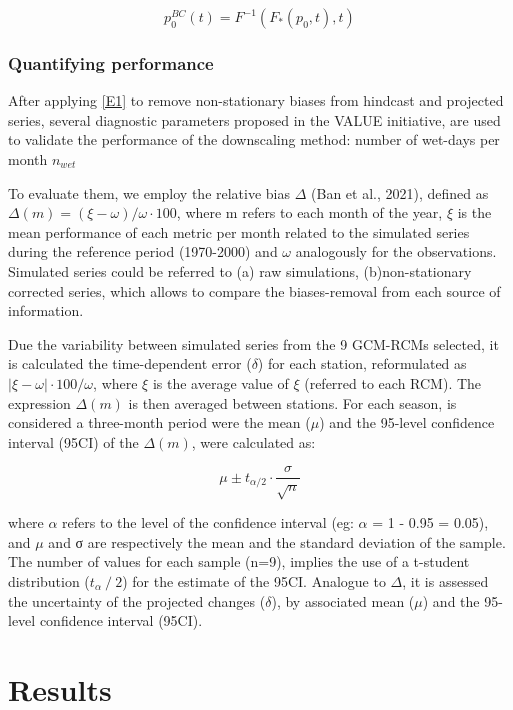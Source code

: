 \documentclass[a4paper,11pt]{article}
\begin{document}
\begin{equation}
p_0^{BC}(t) = F^{-1}(F_*(p_0,t),t)
\label{E1}
\end{equation}

\subsubsection{Quantifying performance} 
After applying \ref{E1} to remove non-stationary biases from hindcast and projected series, several diagnostic parameters proposed in the VALUE initiative, are used to validate the performance of the downscaling method: number of wet-days per month $n_{wet}$

To evaluate them, we employ the relative bias $\Delta$ (Ban et al., 2021), defined as $\Delta(m) =(\xi-\omega)/\omega \cdot 100$, where m refers to each month of the year, $\xi$ is the mean performance of each metric per month related to the simulated series during the reference period (1970-2000) and $\omega$ analogously for the observations. Simulated series could be referred to (a) raw simulations, (b)non-stationary corrected series, which allows to compare the biases-removal from each source of information. 

Due the variability between simulated series from the 9 GCM-RCMs selected, it is calculated the time-dependent error ($\delta$) for each station, reformulated as $ \lvert{\xi} - {\omega}\rvert \cdot 100/ \omega$, where ${\xi}$ is the average value of $\xi$ (referred to each RCM). The expression $\Delta(m)$ is then averaged between stations. For each season, is considered a three-month period were the mean ($\mu$) and the 95-level confidence interval (95CI) of the  $\Delta(m)$, were calculated as: 

\begin{equation}
\mu \pm t_{\alpha/2} \cdot \dfrac{\sigma}{\sqrt{n}}
\label{E2}
\end{equation}

where $\alpha$  refers to the level of the confidence interval (eg: $\alpha$ = 1 - 0.95 = 0.05), and $\mu$ and σ are respectively the mean and the standard deviation of the sample. The number of values for each sample (n=9), implies the use of a t-student distribution ($t_\alpha⁄2$) for the estimate of the 95CI. Analogue to $\Delta$, it is assessed the uncertainty of the projected changes ($\delta$), by associated mean ($\mu$) and the 95-level confidence interval (95CI). 



\section{Results}\label{sec4}
\end{document}
